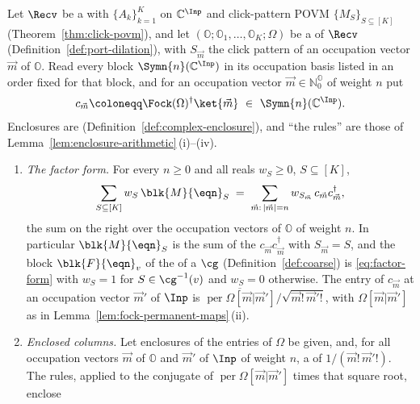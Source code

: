 \begin{theorem}\label{thm:factor-blocks}
Let $\Recv$ be a  with
 $\{A_k\}_{k=1}^{K}$ on
$\mathbb{C}^{\Inp}$ and click-pattern POVM $\{M_S\}_{S\subseteq[K]}$
(Theorem~\ref{thm:click-povm}), and let
$(\mathbb{O};\mathbb{O}_1,\dots,\mathbb{O}_K;\Omega)$ be a
 of $\Recv$ (Definition~\ref{def:port-dilation}), with
$S_{\vec m}$ the click pattern of an occupation vector $\vec m$ of
$\mathbb{O}$. Read every block $\Symn{n}(\mathbb{C}^{\Inp})$ in its
occupation basis listed in an order fixed for that block, and for an
occupation vector $\vec m\in\mathbb{N}_0^{\mathbb{O}}$ of weight $n$ put
\begin{equation}\label{eq:factor-column}
  c_{\vec m}\coloneqq\Fock(\Omega)^{\dagger}\ket{\vec m}
  \ \in\ \Symn{n}(\mathbb{C}^{\Inp}).
\end{equation}
Enclosures are 
(Definition~\ref{def:complex-enclosure}), and ``the rules'' are those of
Lemma~\ref{lem:enclosure-arithmetic}\,(i)--(iv).
\begin{enumerate}[label=(\roman*),leftmargin=3.0em]
\item \emph{The factor form.} For every $n\ge0$ and all reals $w_S\ge0$,
  $S\subseteq[K]$,
  \begin{equation}\label{eq:factor-form}
    \sum_{S\subseteq[K]}w_S\,\blk{M}{\eqn}_S
    \;=\;\sum_{\vec m:\,|\vec m|=n}w_{S_{\vec m}}\,c_{\vec m}c_{\vec m}^{\dagger},
  \end{equation}
  the sum on the right over the occupation vectors of $\mathbb{O}$ of weight
  $n$. In particular $\blk{M}{\eqn}_S$ is the sum of the
  $c_{\vec m}c_{\vec m}^{\dagger}$ with $S_{\vec m}=S$, and the block
  $\blk{F}{\eqn}_v$ of the  of a
   $\cg$ (Definition~\ref{def:coarse}) is
  \eqref{eq:factor-form} with $w_S=1$ for $S\in\cg^{-1}(v)$ and $w_S=0$
  otherwise. The entry of $c_{\vec m}$ at an occupation vector $\vec m'$ of
  $\Inp$ is
  $\overline{\operatorname{per}\Omega[\vec m|\vec m']}\big/\sqrt{\vec m!\,\vec m'!}$,
  with $\Omega[\vec m|\vec m']$ as in
  Lemma~\ref{lem:fock-permanent-maps}\,(ii).
\item \emph{Enclosed columns.} Let enclosures of the entries of $\Omega$ be
  given, and, for all occupation vectors $\vec m$ of $\mathbb{O}$ and
  $\vec m'$ of $\Inp$ of weight $n$, a  of
  $1/(\vec m!\,\vec m'!)$. The rules, applied to the conjugate of
  $\operatorname{per}\Omega[\vec m|\vec m']$ times that square root, enclose

\end{enumerate}
\end{theorem}
